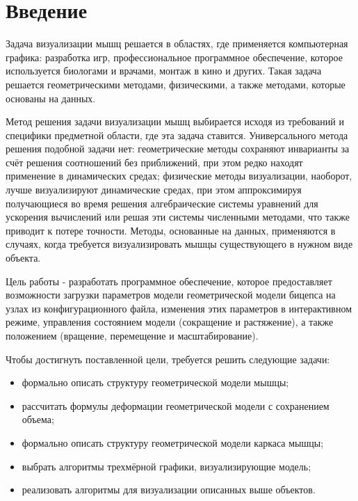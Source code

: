 \chapter*{Введение}

Задача визуализации мышц решается в областях, где применяется компьютерная графика: разработка игр, профессиональное программное обеспечение, которое используется биологами и врачами, монтаж в кино и других. Такая задача решается геометрическими методами, физическими, а также методами, которые основаны на данных.

Метод решения задачи визуализации мышц выбирается исходя из требований и специфики предметной области, где эта задача ставится. Универсального метода решения подобной задачи нет: геометрические методы сохраняют инварианты за счёт решения соотношений без приближений, при этом редко находят применение в динамических средах; физические методы визуализации, наоборот, лучше визуализируют динамические средах, при этом аппроксимируя получающиеся во время решения алгебраические системы уравнений для ускорения вычислений или решая эти системы численными методами, что также приводит к потере точности. Методы, основанные на данных, применяются в случаях, когда требуется визуализировать мышцы существующего в нужном виде объекта.

Цель работы - разработать программное обеспечение, которое предоставляет возможности загрузки параметров модели геометрической модели бицепса на узлах из конфигурационного файла, изменения этих параметров в интерактивном режиме, управления состоянием модели (сокращение и растяжение), а также положением (вращение, перемещение и масштабирование).

Чтобы достигнуть поставленной цели, требуется решить следующие задачи:
\begin{itemize}
    \item формально описать структуру геометрической модели мышцы;
    \item рассчитать формулы деформации геометрической модели с сохранением объема;
    \item формально описать структуру геометрической модели каркаса мышцы;
    \item выбрать алгоритмы трехмёрной графики, визуализирующие модель;
    \item реализовать алгоритмы для визуализации описанных выше объектов.
\end{itemize}

